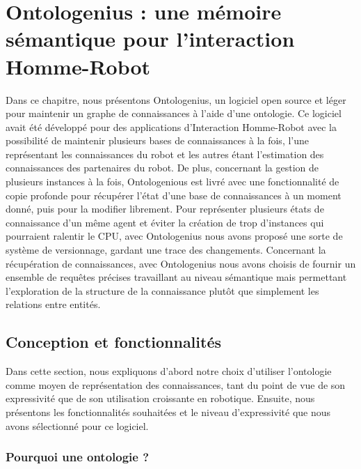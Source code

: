 \section*{Ontologenius : une mémoire sémantique pour l'interaction Homme-Robot}

Dans ce chapitre, nous présentons Ontologenius, un logiciel open source et léger pour maintenir un graphe de connaissances à l'aide d'une ontologie. Ce logiciel avait été développé pour des applications d'Interaction Homme-Robot avec la possibilité de maintenir plusieurs bases de connaissances à la fois, l'une représentant les connaissances du robot et les autres étant l'estimation des connaissances des partenaires du robot. De plus, concernant la gestion de plusieurs instances à la fois, Ontologenious est livré avec une fonctionnalité de copie profonde pour récupérer l'état d'une base de connaissances à un moment donné, puis pour la modifier librement. Pour représenter plusieurs états de connaissance d'un même agent et éviter la création de trop d'instances qui pourraient ralentir le CPU, avec Ontologenius nous avons proposé une sorte de système de versionnage, gardant une trace des changements. Concernant la récupération de connaissances, avec Ontologenius nous avons choisis de fournir un ensemble de requêtes précises travaillant au niveau sémantique mais permettant l'exploration de la structure de la connaissance plutôt que simplement les relations entre entités.

\subsection*{Conception et fonctionnalités}

Dans cette section, nous expliquons d'abord notre choix d'utiliser l'ontologie comme moyen de représentation des connaissances, tant du point de vue de son expressivité que de son utilisation croissante en robotique. Ensuite, nous présentons les fonctionnalités souhaitées et le niveau d'expressivité que nous avons sélectionné pour ce logiciel.

\subsubsection*{Pourquoi une ontologie ?}


